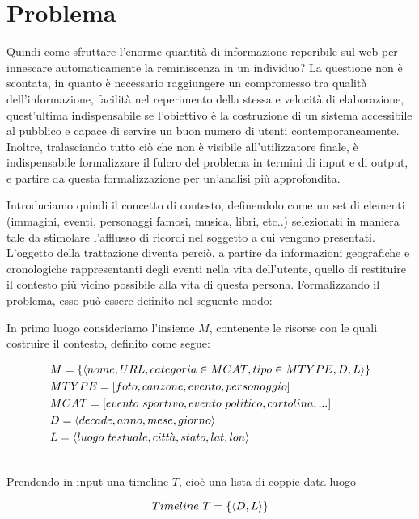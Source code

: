 \documentclass[sigproc-sp.tex]{subfiles}
\begin{document}
\section{Problema}
Quindi come sfruttare l’enorme quantità di informazione reperibile sul web per innescare automaticamente la reminiscenza in un individuo? La questione non è scontata, in quanto è necessario raggiungere un compromesso tra qualità dell’informazione, facilità nel reperimento della stessa e velocità di elaborazione, quest’ultima indispensabile se l’obiettivo è la costruzione di un sistema accessibile al pubblico e capace di servire un buon numero di utenti contemporaneamente. Inoltre, tralasciando tutto ciò che non è visibile all’utilizzatore finale, è indispensabile formalizzare il fulcro del problema in termini di input e di output, e partire da questa formalizzazione per un’analisi più approfondita.

Introduciamo quindi il concetto di contesto, definendolo come un set di elementi (immagini, eventi, personaggi famosi, musica, libri, etc..) selezionati in maniera tale da stimolare l’afflusso di ricordi nel soggetto a cui vengono presentati. L’oggetto della trattazione diventa perciò, a partire da informazioni geografiche e cronologiche rappresentanti degli eventi nella vita dell’utente, quello di restituire il contesto più vicino possibile alla vita di questa persona.
Formalizzando il problema, esso può essere definito nel seguente modo:
 
In primo luogo consideriamo l'insieme $M$, contenente le risorse con le quali costruire il contesto, definito come segue:

\begin{equation}
\begin{split}
&M = \{\langle nome, URL, categoria \in MCAT, tipo \in MTYPE , D, L\rangle\}\\
&MTYPE = [ foto,canzone,evento,personaggio ]\\
&MCAT = [evento \ sportivo,evento \ politico, cartolina, ...]\\
&D =  \langle decade, anno, mese, giorno\rangle\\
&L =  \langle luogo \ testuale, citt\grave{a}, stato, lat, lon\rangle\\
\notag
\end{split}
\end{equation}

Prendendo in input una timeline $T$, cioè una lista di coppie data-luogo

\begin{equation}
Timeline \ T = \{\langle D,L\rangle\}
\notag
\end{equation}
\end{document}

